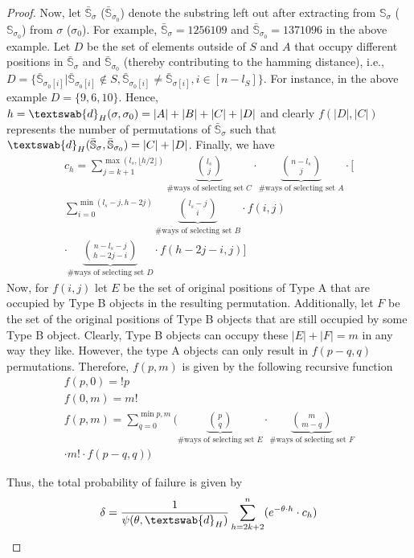 \begin{proof}
 \par Now, let $\bar{\mathbb{S}}_{\sigma}$ ($\bar{\mathbb{S}}_{\sigma_0}$) denote the substring left out after extracting from $\mathbb{S}_{\sigma}$ ($\mathbb{S}_{\sigma_0}$) from $\sigma$ ($\sigma_0$). For example, $\bar{\mathbb{S}}_{\sigma}=1256 10 9$ and $\bar{\mathbb{S}}_{\sigma_0}=13710 9 6$ in the above example. Let $D$ be the set of elements outside of $S$  and $A$ that occupy different positions in $\bar{\mathbb{S}}_\sigma$ and $\bar{\mathbb{S}}_{\sigma_0}$ (thereby contributing to the hamming distance), i.e., $D=\{\bar{\mathbb{S}}_{\sigma_0[i]}|\bar{\mathbb{S}}_{\sigma_0[i]} \not \in S, \bar{\mathbb{S}}_{\sigma_0[i]} \neq \bar{\mathbb{S}}_{\sigma[i]}, i \in [n-l_S]\}$. For instance, in the above example $D=\{9,6,10\}$. Hence, $h=\textswab{d}_{H}(\sigma,\sigma_0)=|A|+|B|+|C|+|D|$ and clearly $f(|D|,|C|)$ represents the number of permutations of $\bar{\mathbb{S}}_{\sigma}$ such that $\textswab{d}_H(\bar{\mathbb{S}}_{\sigma},\bar{\mathbb{S}}_{\sigma_0})=|C|+|D|$. Finally, we have 
\begin{gather*}c_h=\sum_{j=k+1}^{\max(l_s,\lfloor h/2\rfloor)}\underbrace{\binom{l_s}{j}}_{\text{\# ways of selecting set $C$}}\cdot \underbrace{\binom{n-l_s}{j}}_{\text{\# ways of selecting set $A$}}\cdot \Bigg[\\\sum_{i=0}^{\min(l_s-j,h-2j)}\underbrace{\binom{l_s-j}{i}}_{\text{\# ways of selecting set $B$}}\cdot f(i,j)\\\cdot\underbrace{\binom{n-l_s-j}{h-2j-i}}_{\text{\# ways of selecting set $D$}} \cdot f(h-2j-i,j)\Bigg]\end{gather*}
Now, for $f(i,j)$ let $E$ be the set of original positions of Type A that are occupied by Type B objects in the resulting permutation. Additionally, let $F$ be the set of the original positions of Type B objects that are still occupied by some Type B object. Clearly, Type B objects can occupy these $|E
|+|F|=m$ in any way they like. However, the type A objects can only result in $f(p-q,q)$ permutations. Therefore, $f(p,m)$ is given by the following recursive function \begin{gather*}
f(p,0)=!p\\
f(0,m)=m!\\
f(p,m)=\sum_{q=0}^{\min{p,m}}\Bigg(\underbrace{\binom{p}{q}}_{\text{\# ways of selecting set $E$}}\cdot\underbrace{\binom{m}{m-q}}_{\text{\# ways of selecting set $F$}}\\\cdot m! \cdot f(p-q,q)\Bigg)\end{gather*}

Thus, the total probability of failure is given by 
\begin{gather}\delta=\frac{1}{\psi(\theta, \textswab{d}_H)}\sum_{h=2k+2}^{n} (e^{-\theta\cdot h} \cdot c_h)\end{gather}
\end{proof}






